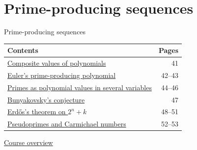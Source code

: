 \documentclass[aspectratio=169,11pt]{beamer}
\begin{document}
\section{Prime-producing sequences}

\begin{frame}{Prime-producing sequences}
\small\renewcommand{\arraystretch}{1.35}
\begin{tabular}{p{}r}\textbf{Contents}&\textbf{Pages}\\\midrule
\hyperlink{Navigation41}{Composite values of polynomials}&41\\
\hyperlink{Navigation42}{Euler's prime-producing polynomial}&42--43\\
\hyperlink{Navigation44}{Primes as polynomial values in several variables}&44--46\\
\hyperlink{Navigation47}{Bunyakovsky's conjecture}&47\\
\hyperlink{Navigation48}{Erd\H{o}s's theorem on $2^n+k$}&48--51\\
\hyperlink{Navigation52}{Pseudoprimes and Carmichael numbers}&52--53\\
\end{tabular}\par\medskip\hyperlink{overview}{\color{teal}Course overview}\end{frame}
\end{document}
